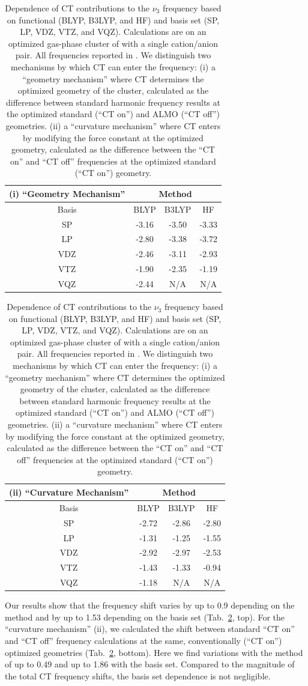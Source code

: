 \documentclass[%
  class = book,%
  crop = false,%
  float = true,%
  multi = true,%
  preview = false,%
]{standalone}
\begin{document}
\begin{table}
  \centering
  \caption[Charge transfer dependence of \texorpdfstring{ \(\nu_3\)}{carbon dioxide asymmetric stretch} frequencies]{Dependence of CT contributions to the \(\nu_3\) frequency based on functional (BLYP, B3LYP, and HF) and basis set (SP, LP, VDZ, VTZ, and VQZ). Calculations are on an optimized gas-phase cluster of  with a single cation/anion pair. All frequencies reported in \si{\wavenumber}. We distinguish two mechanisms by which CT can enter the frequency: (i) a ``geometry mechanism'' where CT determines the optimized geometry of the cluster, calculated as the difference between standard harmonic frequency results at the optimized standard (``CT on'') and ALMO (``CT off'') geometries. (ii) a ``curvature mechanism'' where CT enters by modifying the force constant at the optimized geometry, calculated as the difference between the ``CT on'' and ``CT off'' frequencies at the optimized standard (``CT on'') geometry.}
  \label{paper_02:tab:3}
  \begin{tabular}{cccc}
    (i) ``Geometry Mechanism'' & \multicolumn{3}{c}{Method} \\
    \hline
    Basis & BLYP & B3LYP & HF \\
    \hline
    SP & -3.16 & -3.50 & -3.33 \\
    LP & -2.80 & -3.38 & -3.72 \\
    VDZ & -2.46 & -3.11 & -2.93 \\
    VTZ & -1.90 & -2.35 & -1.19 \\
    VQZ & -2.44 & N/A & N/A
  \end{tabular}
  \begin{tabular}{cccc}
    (ii) ``Curvature Mechanism'' & \multicolumn{3}{c}{Method} \\
    \hline
    Basis & BLYP & B3LYP & HF \\
    \hline
    SP & -2.72 & -2.86 & -2.80 \\
    LP & -1.31 & -1.25 & -1.55 \\
    VDZ & -2.92 & -2.97 & -2.53 \\
    VTZ & -1.43 & -1.33 & -0.94 \\
    VQZ & -1.18 & N/A & N/A
  \end{tabular}
\end{table}

Our results show that the frequency shift varies by up to \SI{0.9}{\wavenumber} depending on the method and by up to \SI{1.53}{\wavenumber} depending on the basis set (Tab.~\ref{paper_02:tab:3}, top). For the ``curvature mechanism'' (ii), we calculated the shift between standard ``CT on'' and ``CT off'' frequency calculations at the same, conventionally (``CT on'') optimized geometries (Tab.~\ref{paper_02:tab:3}, bottom). Here we find variations with the method of up to \SI{0.49}{\wavenumber} and up to \SI{1.86}{\wavenumber} with the basis set. Compared to the magnitude of the total CT frequency shifts, the basis set dependence is not negligible.
\end{document}
